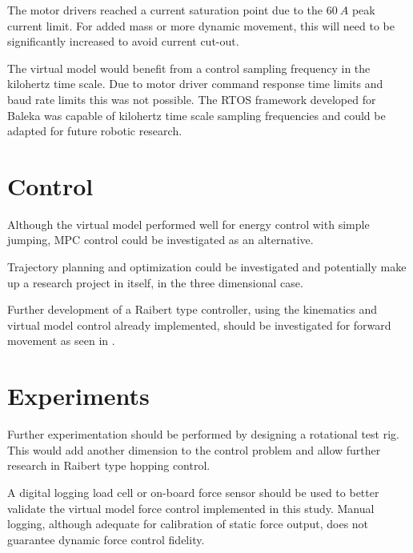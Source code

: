 The motor drivers reached a current saturation point due to the $60\ A$ peak current limit. For added mass or more dynamic movement, this will need to be significantly increased to avoid current cut-out.

The virtual model would benefit from a control sampling frequency in the kilohertz time scale. Due to motor driver command response time limits and baud rate limits this was not possible. The RTOS framework developed for Baleka was capable of kilohertz time scale sampling frequencies and could be adapted for future robotic research.

\section{Control}

Although the virtual model performed well for energy control with simple jumping, MPC control could be investigated as an alternative.

Trajectory planning and optimization could be investigated and potentially make up a research project in itself, in the three dimensional case.

Further development of a Raibert type controller, using the kinematics and virtual model control already implemented, should be investigated for forward movement as seen in \cite{Raibert1984}.

\section{Experiments}

Further experimentation should be performed by designing a rotational test rig. This would add another dimension to the control problem and allow further research in Raibert type hopping control. 

A digital logging load cell or on-board force sensor should be used to better validate the virtual model force control implemented in this study. Manual logging, although adequate for calibration of static force output, does not guarantee dynamic force control fidelity.
